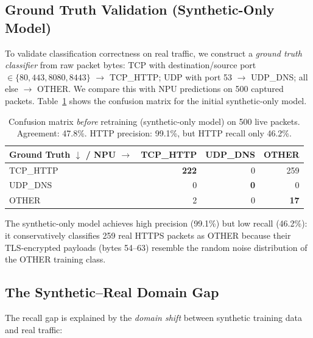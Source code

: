 \documentclass[11pt,a4paper,twoside]{article}
\theoremstyle{definition}
\theoremstyle{remark}
\begin{document}
\subsection{Ground Truth Validation (Synthetic-Only Model)}

To validate classification correctness on real traffic, we construct a \emph{ground truth classifier} from raw packet bytes: TCP with destination/source port $\in \{80, 443, 8080, 8443\}$ $\to$ \textsc{TCP\_HTTP}; UDP with port 53 $\to$ \textsc{UDP\_DNS}; all else $\to$ \textsc{OTHER}. We compare this with NPU predictions on 500 captured packets. Table~\ref{tab:confusion-before} shows the confusion matrix for the initial synthetic-only model.

\begin{table}[H]
\centering
\small
\begin{tabular}{l|rrr}
\toprule
\textbf{Ground Truth $\downarrow$ / NPU $\to$} & \textbf{TCP\_HTTP} & \textbf{UDP\_DNS} & \textbf{OTHER} \\
\midrule
TCP\_HTTP & \textbf{222} & 0   & 259 \\
UDP\_DNS  & 0   & \textbf{0}   & 0   \\
OTHER     & 2   & 0   & \textbf{17}  \\
\bottomrule
\end{tabular}
\caption{Confusion matrix \emph{before} retraining (synthetic-only model) on 500 live packets. Agreement: 47.8\%. HTTP precision: 99.1\%, but HTTP recall only 46.2\%.}
\label{tab:confusion-before}
\end{table}

\noindent The synthetic-only model achieves high precision (99.1\%) but low recall (46.2\%): it conservatively classifies 259 real HTTPS packets as \textsc{OTHER} because their TLS-encrypted payloads (bytes 54--63) resemble the random noise distribution of the \textsc{OTHER} training class.

\subsection{The Synthetic--Real Domain Gap}

The recall gap is explained by the \emph{domain shift} between synthetic training data and real traffic:
\end{document}
